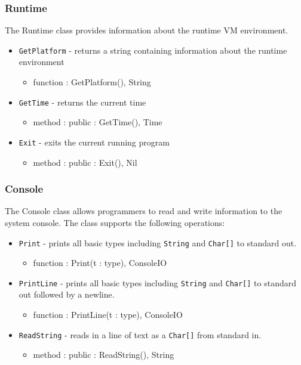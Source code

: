 \documentclass[12pt]{article}
\begin{document}
\subsubsection{Runtime}
The Runtime class provides information about the runtime VM environment.
\begin{itemize}
\item \texttt{GetPlatform} - returns a string containing information
  about the runtime environment
  \begin{itemize}
  \item function : GetPlatform(), String
  \end{itemize}
\item \texttt{GetTime} - returns the current time
  \begin{itemize}
  \item method : public : GetTime(), Time
  \end{itemize}
\item \texttt{Exit} - exits the current running program
  \begin{itemize}
  \item method : public : Exit(), Nil
  \end{itemize}
\end{itemize}

\subsubsection{Console}
The Console class allows programmers to read and write information to the system console.    The class supports the following operations:
\begin{itemize}
\item 
  \texttt{Print} - prints all basic types including
  \texttt{String} and \texttt{Char[]} to standard out.
  \begin{itemize}
  \item function : Print(t : type), ConsoleIO
  \end{itemize}
\item \texttt{PrintLine} - prints all basic types including
  \texttt{String} and \texttt{Char[]} to standard out followed by a
  newline.
  \begin{itemize}
  \item function : PrintLine(t : type), ConsoleIO
  \end{itemize}
\item \texttt{ReadString} - reads in a line of text as a \texttt{Char[]} from standard in.
  \begin{itemize}
  \item method : public : ReadString(), String
  \end{itemize}
\end{itemize}
\end{document}
